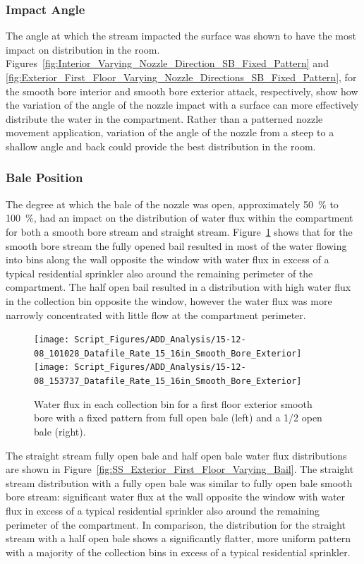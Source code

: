 \documentclass[12pt,oneside]{book}
\begin{document}
\clearpage

\subsubsection{Impact Angle}
The angle at which the stream impacted the surface was shown to have the most impact on distribution in the room. Figures~\ref{fig:Interior_Varying_Nozzle_Direction_SB_Fixed_Pattern} and \ref{fig:Exterior_First_Floor_Varying_Nozzle_Directions_SB_Fixed_Pattern}, for the smooth bore interior and smooth bore exterior attack, respectively, show how the variation of the angle of the nozzle impact with a surface can more effectively distribute the water in the compartment. Rather than a patterned nozzle movement application, variation of the angle of the nozzle from a steep to a shallow angle and back could provide the best distribution in the room.  

\subsubsection{Bale Position}
The degree at which the bale of the nozzle was open, approximately 50~\% to 100~\%, had an impact on the distribution of water flux within the compartment for both a smooth bore stream and straight stream. Figure~\ref{fig:SB_Exterior_First_Floor_Varying_Bail} shows that for the smooth bore stream the fully opened bail resulted in most of the water flowing into bins along the wall opposite the window with water flux in excess of a typical residential sprinkler also around the remaining perimeter of the compartment. The half open bail resulted in a distribution with high water flux in the collection bin opposite the window, however the water flux was more narrowly concentrated with little flow at the compartment perimeter. 

\begin{figure}[ht]
\texttt{[image: Script\_Figures/ADD\_Analysis/15-12-08\_101028\_Datafile\_Rate\_15\_16in\_Smooth\_Bore\_Exterior]}
\texttt{[image: Script\_Figures/ADD\_Analysis/15-12-08\_153737\_Datafile\_Rate\_15\_16in\_Smooth\_Bore\_Exterior]} \\ 
\caption[Water Flux Varying Bale Opening Smooth Bore]{Water flux in each collection bin for a first floor exterior smooth bore with a fixed pattern from full open bale (left) and a 1/2 open bale (right).}
\label{fig:SB_Exterior_First_Floor_Varying_Bail}
\end{figure}

The straight stream fully open bale and half open bale water flux distributions are shown in Figure~\ref{fig:SS_Exterior_First_Floor_Varying_Bail}. The straight stream distribution with a fully open bale was similar to fully open bale smooth bore stream: significant water flux at the wall opposite the window with water flux in excess of a typical residential sprinkler also around the remaining perimeter of the compartment. In comparison, the distribution for the straight stream with a half open bale shows a significantly flatter, more uniform pattern with a majority of the collection bins in excess of a typical residential sprinkler.
\end{document}
